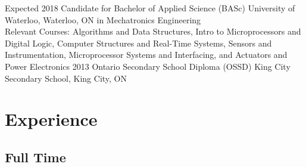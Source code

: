 \documentclass[hidelinks]{kkurucz-cv}
\begin{document}
\begin{entrylist}
\entry
{Expected 2018}
{Candidate for Bachelor of Applied Science (BASc)}
{University of Waterloo, Waterloo, ON}
{{\headingfont in Mechatronics Engineering}}
{
\\Relevant Courses: Algorithms and Data Structures, Intro to Microprocessors and Digital Logic, Computer Structures and Real-Time Systems, Sensors and Instrumentation, Microprocessor Systems and Interfacing, and Actuators and Power Electronics
}
\entry
{2013}
{Ontario Secondary School Diploma (OSSD)}
{King City Secondary School, King City, ON}
{\null}
{\null}
\end{entrylist}

\vspace{-4.5mm}
\section{Experience}

\subsection{Full Time}
\end{document}
